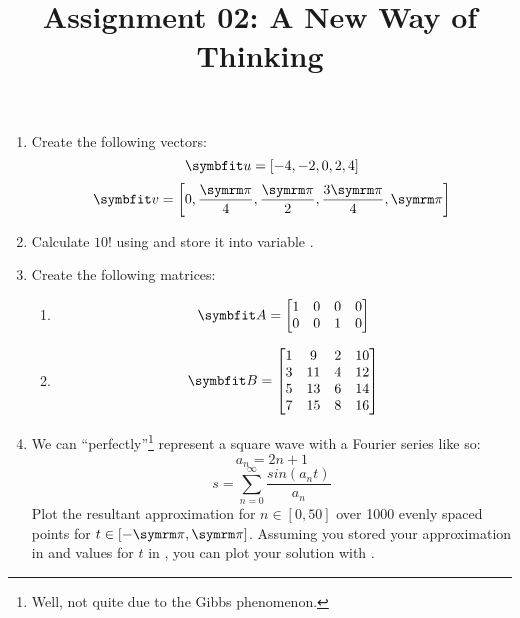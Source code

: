 \documentclass{article}
\title{Assignment 02: A New Way of Thinking}
\begin{document}
\renderTitle

\begin{enumerate}[leftmargin=*]
	\item
		Create the following vectors:
		\begin{equation}
			\mat{u}
			=
			[-4, -2, 0, 2, 4]
		\end{equation}
		\begin{equation}
			\mat{v}
			=
			\left[
				0,
				\frac{\cpi}{4},
				\frac{\cpi}{2},
				\frac{3\cpi}{4},
				\cpi
			\right]
		\end{equation}

	\item
		Calculate \(10!\) using  and
		store it into variable .

	\item
		Create the following matrices:
		\begin{enumerate}
			\item
				\begin{equation}
					\mat{A}
					=
					\begin{bmatrix}
						1 & 0 & 0 & 0 \\
						0 & 0 & 1 & 0 \\
					\end{bmatrix}
				\end{equation}

			\item
				\begin{equation}
					\mat{B}
					=
					\begin{bmatrix}
						1 &  9 & 2 & 10 \\
						3 & 11 & 4 & 12 \\
						5 & 13 & 6 & 14 \\
						7 & 15 & 8 & 16 \\
					\end{bmatrix}
				\end{equation}
		\end{enumerate}

	\item
		We can \enquote{perfectly}\footnote{Well, not quite due
		to the Gibbs phenomenon.} represent a square wave with a
		Fourier series like so:
		\begin{equation}
			a_n = 2n + 1
		\end{equation}
		\begin{equation}
			s
			=
			\sum_{n = 0}^\infty
			\frac{sin(a_n t)}{a_n}
		\end{equation}
		Plot the resultant approximation for \(n \in [0, 50]\)
		over 1000 evenly spaced points for \(t \in [-\cpi,
		\cpi]\).  Assuming you stored your approximation in
		 and values for \(t\) in , you
		can plot your solution with .

\end{enumerate}
\end{document}
